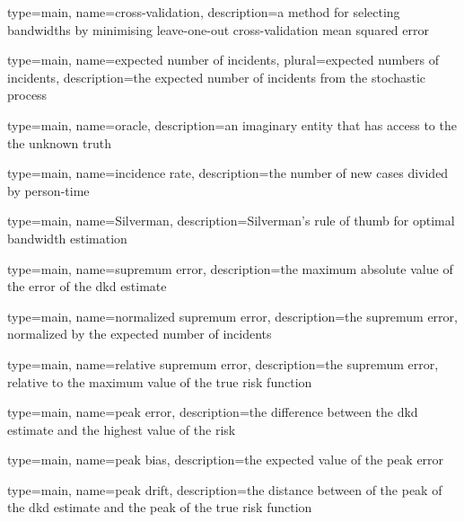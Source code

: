

{%
   type=main,
   name={cross-validation},
   description={a method for selecting bandwidths by minimising leave-one-out cross-validation mean squared error}
}

{%
   type=main,
   name={expected number of incidents},
   plural={expected numbers of incidents},
   description={the expected number of incidents from the stochastic process}
}

{
   type=main,
   name={oracle},
   description={an imaginary entity that has access to the the unknown truth}
}

{
   type=main,
   name={incidence rate},
   description={the number of new cases divided by person-time}
}

{
   type=main,
   name={Silverman},
   description={Silverman's rule of thumb for optimal bandwidth estimation}
}

{%
   type=main,
   name={supremum error},
   description={the maximum absolute value of the error of the dkd estimate}
}

{%
   type=main,
   name={normalized supremum error},
   description={the supremum error, normalized by the expected number of incidents}
}

{%
   type=main,
   name={relative supremum error},
   description={the supremum error, relative to the maximum value of the true risk function}
}

{%
   type=main,
   name={peak error},
   description={the difference between the dkd estimate and the highest value of the risk}
}

{%
   type=main,
   name={peak bias},
   description={the expected value of the peak error}
}

{%
   type=main,
   name={peak drift},
   description={the distance between of the peak of the dkd estimate and the peak of the true risk function}
}

